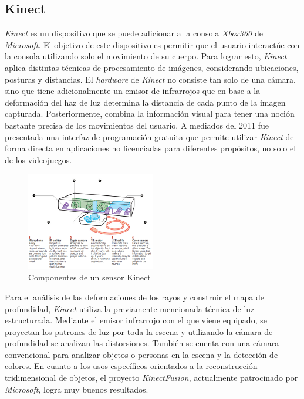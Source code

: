 \subsection{Kinect}

\emph{Kinect} es un dispositivo que se puede adicionar a la consola \emph{Xbox360} de \emph{Microsoft}. El objetivo de este dispositivo es permitir que el usuario interactúe con la consola utilizando solo el movimiento de su cuerpo. Para lograr esto, \emph{Kinect} aplica distintas técnicas de procesamiento de imágenes, considerando ubicaciones, posturas y distancias. El \emph{hardware} de \emph{Kinect} no consiste tan solo de una cámara, sino que tiene adicionalmente un emisor de infrarrojos que en base a la deformación del haz de luz determina la distancia de cada punto de la imagen capturada. Posteriormente, combina la información visual para tener una noción bastante precisa de los movimientos del usuario. A mediados del 2011 fue presentada una interfaz de programación gratuita que permite utilizar \emph{Kinect} de forma directa en aplicaciones no licenciadas para diferentes propósitos, no solo el de los videojuegos.

\begin{figure}[H]
  \centering
    \includegraphics[width=0.5\textwidth]{./Cap6_reconstruccion/kinect.PNG}
  \caption{Componentes de un sensor Kinect}
  \label{fig:Kinect}
\end{figure}

Para el análisis de las deformaciones de los rayos y construir el mapa de profundidad, \emph{Kinect} utiliza la previamente mencionada técnica de luz estructurada. Mediante el emisor infrarrojo con el que viene equipado, se proyectan los patrones de luz por toda la escena y utilizando la cámara de profundidad se analizan las distorsiones.
También se cuenta con una cámara convencional para analizar objetos o personas en la escena y la detección de colores.
En cuanto a los usos específicos orientados a la reconstrucción tridimensional de objetos, el proyecto \emph{KinectFusion}\cite{KinectFusion}, actualmente patrocinado por \emph{Microsoft}, logra muy buenos resultados.%

